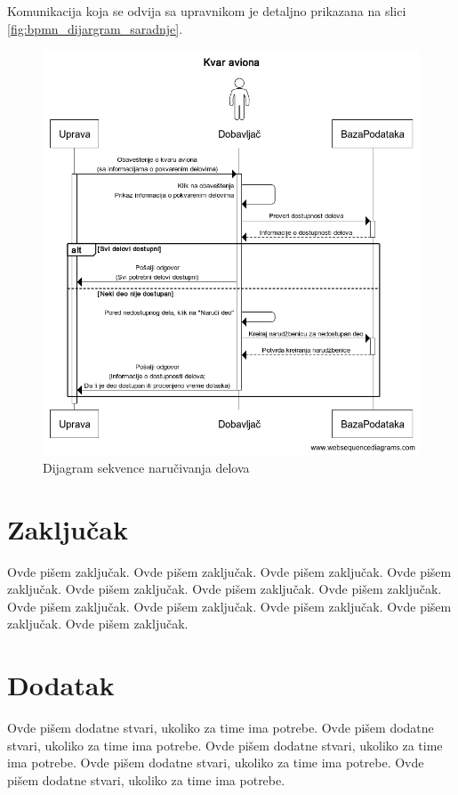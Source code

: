 \documentclass[a4paper]{article}
\begin{document}
Komunikacija koja se odvija sa upravnikom je detaljno prikazana na slici \ref{fig:bpmn_dijargram_saradnje}.
\begin{figure}[H]
\begin{center}
\includegraphics[scale=0.4]{Dijagrami/Dijagrami_sekvence/Dijagram_sekvenci_narucivanje_delova.png}
\end{center}
\caption{Dijagram sekvence naručivanja delova}
\label{fig:ds_narucivanje_delova}
\end{figure}

\section{Zaključak}
\label{sec:zakljucak}

Ovde pišem zaključak. 
Ovde pišem zaključak. 
Ovde pišem zaključak. 
Ovde pišem zaključak. 
Ovde pišem zaključak. 
Ovde pišem zaključak. 
Ovde pišem zaključak. 
Ovde pišem zaključak. 
Ovde pišem zaključak. 
Ovde pišem zaključak. 
Ovde pišem zaključak. 
Ovde pišem zaključak. 


\appendix
 


\appendix
\section{Dodatak}
Ovde pišem dodatne stvari, ukoliko za time ima potrebe.
Ovde pišem dodatne stvari, ukoliko za time ima potrebe.
Ovde pišem dodatne stvari, ukoliko za time ima potrebe.
Ovde pišem dodatne stvari, ukoliko za time ima potrebe.
Ovde pišem dodatne stvari, ukoliko za time ima potrebe.
\end{document}
